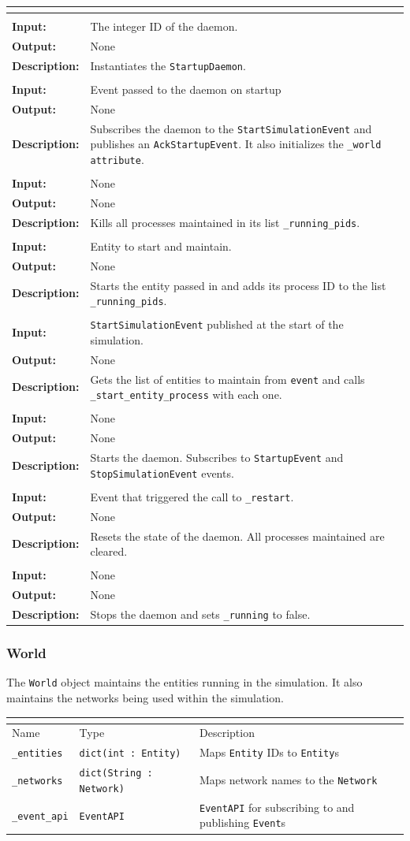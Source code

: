 \documentclass[titlepage]{article}
\newcommand{\operations}[1]{
\begin{center}
    \begin{longtable}{|p{4cm}|p{10cm + 2.0\tabcolsep}|}
    \hline
    \multicolumn{2}{|l|}{\cellcolor[gray]{0.5}{\textbf{Operations}}} \\ \hline
#1
    \end{longtable}
\end{center}
}
\newcommand{\operation}[4]{
    \hline
    \multicolumn{2}{|l|}{\cellcolor[gray]{0.8}{\texttt{#1}}} \\ \hline
    \hspace{7pt}\textbf{Input:} & #2 \\ \hline
    \hspace{7pt}\textbf{Output:} & #3 \\ \hline
    \hspace{7pt}\textbf{Description:} & #4 \\ \hline
}
\newcommand{\attributes}[1]{
    \begin{center}
        \begin{tabular}{|p{3.5cm}|p{3.5cm}|p{7cm}|}
            \multicolumn{3}{|l|}{\cellcolor[gray]{0.5}{\textbf{Attributes}}} \\ \hline
            \rowcolor[gray]{0.8} Name & Type & Description \\ \hline 
            #1
        \end{tabular}
    \end{center}
}
\newcommand{\attribute}[3]{
    \texttt{#1} & \texttt{#2} & #3 \\ \hline
}
\begin{document}
\operations{
    \operation{\_\_init\_\_(phys\_id)}{The integer ID of the daemon.}{None}{Instantiates the \texttt{StartupDaemon}.}
    \operation{\_on\_startup(event)}{Event passed to the daemon on startup}{None}{Subscribes the daemon to the \texttt{StartSimulationEvent} and publishes an \texttt{AckStartupEvent}. It also initializes the \texttt{\_world attribute}.}
    \operation{terminate\_all()}{None}{None}{Kills all processes maintained in its list \texttt{\_running\_pids}.}
    \operation{\_start\_entity\_processes(entity)}{Entity to start and maintain.}{None}{Starts the entity passed in and adds its process ID to the list \texttt{\_running\_pids}.}
    \operation{\_on\_sim\_start(event)}{\texttt{StartSimulationEvent} published at the start of the simulation.}{None}{Gets the list of entities to maintain from \texttt{event} and calls \texttt{\_start\_entity\_process} with each one.}
    \operation{start()}{None}{None}{Starts the daemon. Subscribes to \texttt{StartupEvent} and \texttt{StopSimulationEvent} events.}
    \operation{\_restart(event)}{Event that triggered the call to \texttt{\_restart}.}{None}{Resets the state of the daemon. All processes maintained are cleared.}
    \operation{stop()}{None}{None}{Stops the daemon and sets \texttt{\_running} to false.}
}

\subsubsection{World}
{The \texttt{World} object maintains the entities running in the simulation. It also maintains the networks being used within the simulation.}

\attributes{
    \attribute{\_entities}{dict(int : Entity)}{Maps \texttt{Entity} IDs to \texttt{Entity}s}
    \attribute{\_networks}{dict(String : Network)}{Maps network names to the \texttt{Network}}
    \attribute{\_event\_api}{EventAPI}{\texttt{EventAPI} for subscribing to and publishing \texttt{Event}s}
}
\end{document}
